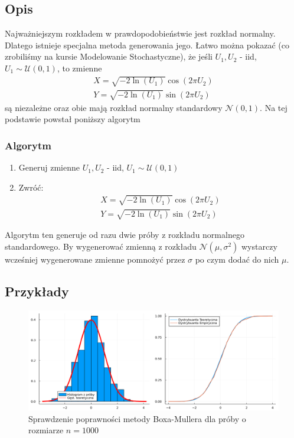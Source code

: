 \documentclass[12pt]{mwrep}
\begin{document}
	\subsection{Opis}
	\noindent Najważniejszym rozkładem w prawdopodobieństwie jest rozkład normalny. Dlatego istnieje specjalna metoda generowania jego. Łatwo można pokazać (co zrobiliśmy na kursie Modelowanie Stochastyczne), że jeśli $U_1,U_2$ - iid, $U_1\sim\mathcal{U}(0,1)$, to zmienne
	\begin{equation}\label{eq:B-M}
		\begin{split}
			X=\sqrt{-2\ln(U_1)}\cos(2\pi U_2)\\
			Y=\sqrt{-2\ln(U_1)}\sin(2\pi U_2)
		\end{split}
	\end{equation}
	są niezależne oraz obie mają rozkład normalny standardowy $\mathcal{N}(0,1)$. Na tej podstawie powstał poniższy algorytm
	\subsubsection{Algorytm}
	\begin{enumerate}[leftmargin=10mm]
		\item Generuj zmienne $U_1, U_2$ - iid, $U_1\sim\mathcal{U}(0,1)$
		\item Zwróć:
		\begin{equation}
			\begin{split}
				X=\sqrt{-2\ln(U_1)}\cos\left(2\pi U_2\right)\\
				Y=\sqrt{-2\ln(U_1)}\sin\left(2\pi U_2\right)
			\end{split}
		\end{equation}
	\end{enumerate}
	Algorytm ten generuje od razu dwie próby z rozkładu normalnego standardowego. By wygenerować zmienną z rozkładu $\mathcal{N}(\mu,\sigma^2)$ wystarczy wcześniej wygenerowane zmienne pomnożyć przez $\sigma$ po czym dodać do nich $\mu$.
	\subsection{Przykłady}
	
	\begin{figure}[H]\caption{Sprawdzenie poprawności metody Boxa-Mullera dla próby o rozmiarze $n=1000$}\label{fig:BM}
		\includegraphics[width=\columnwidth]{fig/fig_BM.png}
	\end{figure}
	
\end{document}
